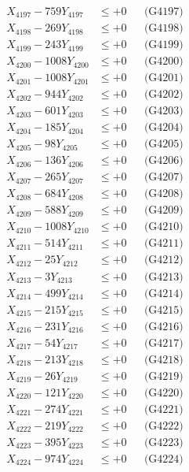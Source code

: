 \documentclass[a4paper,10pt]{article}
\begin{document}
{\begin{align}
X_{4197} - 759Y_{4197} &\leq +0 && \text{(G4197)} \\
X_{4198} - 269Y_{4198} &\leq +0 && \text{(G4198)} \\
X_{4199} - 243Y_{4199} &\leq +0 && \text{(G4199)} \\
X_{4200} - 1008Y_{4200} &\leq +0 && \text{(G4200)} \\
\allowbreak
X_{4201} - 1008Y_{4201} &\leq +0 && \text{(G4201)} \\
X_{4202} - 944Y_{4202} &\leq +0 && \text{(G4202)} \\
X_{4203} - 601Y_{4203} &\leq +0 && \text{(G4203)} \\
X_{4204} - 185Y_{4204} &\leq +0 && \text{(G4204)} \\
X_{4205} - 98Y_{4205} &\leq +0 && \text{(G4205)} \\
X_{4206} - 136Y_{4206} &\leq +0 && \text{(G4206)} \\
X_{4207} - 265Y_{4207} &\leq +0 && \text{(G4207)} \\
X_{4208} - 684Y_{4208} &\leq +0 && \text{(G4208)} \\
X_{4209} - 588Y_{4209} &\leq +0 && \text{(G4209)} \\
X_{4210} - 1008Y_{4210} &\leq +0 && \text{(G4210)} \\
\allowbreak
X_{4211} - 514Y_{4211} &\leq +0 && \text{(G4211)} \\
X_{4212} - 25Y_{4212} &\leq +0 && \text{(G4212)} \\
X_{4213} - 3Y_{4213} &\leq +0 && \text{(G4213)} \\
X_{4214} - 499Y_{4214} &\leq +0 && \text{(G4214)} \\
X_{4215} - 215Y_{4215} &\leq +0 && \text{(G4215)} \\
X_{4216} - 231Y_{4216} &\leq +0 && \text{(G4216)} \\
X_{4217} - 54Y_{4217} &\leq +0 && \text{(G4217)} \\
X_{4218} - 213Y_{4218} &\leq +0 && \text{(G4218)} \\
X_{4219} - 26Y_{4219} &\leq +0 && \text{(G4219)} \\
X_{4220} - 121Y_{4220} &\leq +0 && \text{(G4220)} \\
\allowbreak
X_{4221} - 274Y_{4221} &\leq +0 && \text{(G4221)} \\
X_{4222} - 219Y_{4222} &\leq +0 && \text{(G4222)} \\
X_{4223} - 395Y_{4223} &\leq +0 && \text{(G4223)} \\
X_{4224} - 974Y_{4224} &\leq +0 && \text{(G4224)} \\

\end{align}}
\end{document}
